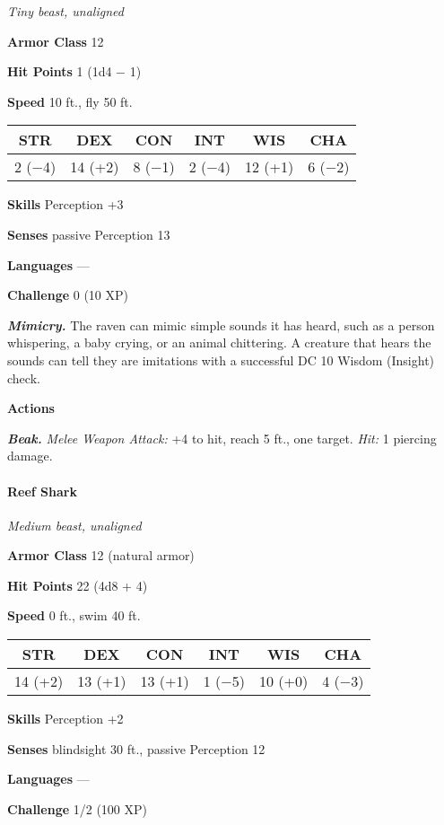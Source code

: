 \documentclass[
]{article}
\begin{document}
\emph{Tiny beast, unaligned}

\textbf{Armor Class} 12

\textbf{Hit Points} 1 (1d4 − 1)

\textbf{Speed} 10 ft., fly 50 ft.

\begin{longtable}[]{@{}cccccc@{}}
\toprule
STR & DEX & CON & INT & WIS & CHA\tabularnewline
\midrule
\endhead
2 (−4) & 14 (+2) & 8 (−1) & 2 (−4) & 12 (+1) & 6 (−2)\tabularnewline
\bottomrule
\end{longtable}

\textbf{Skills} Perception +3

\textbf{Senses} passive Perception 13

\textbf{Languages} ---

\textbf{Challenge} 0 (10 XP)

\emph{\textbf{Mimicry.}} The raven can mimic simple sounds it has heard,
such as a person whispering, a baby crying, or an animal chittering. A
creature that hears the sounds can tell they are imitations with a
successful DC 10 Wisdom (Insight) check.

\textbf{Actions}

\emph{\textbf{Beak.}} \emph{Melee Weapon Attack:} +4 to hit, reach 5
ft., one target. \emph{Hit:} 1 piercing damage.

\hypertarget{reef-shark}{%
\paragraph{Reef Shark}\label{reef-shark}}

\emph{Medium beast, unaligned}

\textbf{Armor Class} 12 (natural armor)

\textbf{Hit Points} 22 (4d8 + 4)

\textbf{Speed} 0 ft., swim 40 ft.

\begin{longtable}[]{@{}cccccc@{}}
\toprule
STR & DEX & CON & INT & WIS & CHA\tabularnewline
\midrule
\endhead
14 (+2) & 13 (+1) & 13 (+1) & 1 (−5) & 10 (+0) & 4 (−3)\tabularnewline
\bottomrule
\end{longtable}

\textbf{Skills} Perception +2

\textbf{Senses} blindsight 30 ft., passive Perception 12

\textbf{Languages} ---

\textbf{Challenge} 1/2 (100 XP)
\end{document}
